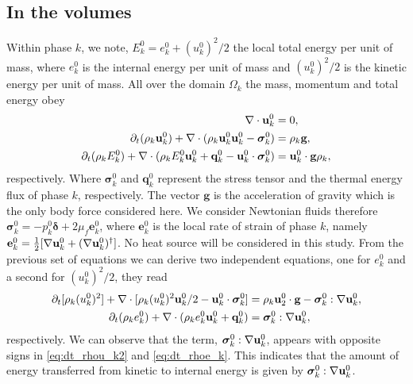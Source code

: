\subsection{In the volumes}
Within phase $k$, we note, $E_k^0 = e_k^0 + (u_k^0)^2/2$ the local total energy per unit of mass, where $e_k^0$ is the internal energy per unit of mass and $(u_k^0)^2/2$ is the kinetic energy per unit of mass.
All over the domain $\Omega_k$ the mass, momentum and total energy obey 
\begin{align}
    \label{eq:dt_rho}
    \div \textbf{u}_k^0
    &= 
    0,\\
    \label{eq:dt_rhou_k}
    \pddt (\rho_k\textbf{u}_k^0)  
    + \div (
        \rho_k\textbf{u}_k^0\textbf{u}_k^0
        - \bm{\sigma}_k^0 
    )
    &= 
    \rho_k \textbf{g},\\
    \label{eq:dt_rhoE_k}
    \pddt (\rho_kE_k^0)  
    + \div (
        \rho_kE_k^0\textbf{u}_k^0
        + \textbf{q}_k^0
        - \textbf{u}_k^0 \cdot \bm{\sigma}_k^0 
        )
    &= 
    \textbf{u}_k^0 \cdot \textbf{g}  \rho_k, 
\end{align} 
respectively. 
Where $\bm\sigma_k^0$ and $\textbf{q}_k^0$ represent the stress tensor and the thermal energy flux of phase $k$, respectively. 
The vector $\textbf{g}$ is the acceleration of gravity which is the only body force considered here.
We consider Newtonian fluids therefore $\bm\sigma_k^0 = -p_k^0\bm\delta + 2\mu_f \textbf{e}_k^0$, where $\textbf{e}_k^0$ is the local rate of strain of phase $k$, namely $\textbf{e}_k^0 = \frac{1}{2}[\mathbf{\nabla} \textbf{u}_k^0 + (\mathbf{\nabla} \textbf{u}_k^0)^\dagger]$. 
No heat source will be considered in this study. 
From the previous set of equations we can derive two independent equations, one for $e_k^0$ and a second for $(u_k^0)^2/2$, they read
\begin{align}
    \label{eq:dt_rhou_k2}
    \pddt [\rho_k(u_k^0)^2]  
    + \div [\rho_k(u_k^0)^2\textbf{u}_k^0/2 - \textbf{u}_k^0 \cdot \bm{\sigma}_k^0]
    &=
    \rho_k\textbf{u}_2^0 \cdot \textbf{g}  
    -  \bm{\sigma}_k^0 : \grad \textbf{u}_k^0,
    \\
    \label{eq:dt_rhoe_k}
    \pddt (\rho_ke_k^0)  
    + \div (
        \rho_ke_k^0\textbf{u}_k^0
        + \textbf{q}_k^0
        )
    &= 
    \bm{\sigma}_k^0 : \grad \textbf{u}_k^0,
\end{align} 
respectively. 
We can observe that the term, $\bm{\sigma}_k^0 : \mathbf{\nabla} \textbf{u}_k^0$,  appears with opposite signs in \ref{eq:dt_rhou_k2} and \ref{eq:dt_rhoe_k}.
This indicates that the amount of energy transferred from kinetic to internal energy is given by $\bm{\sigma}_k^0 : \mathbf{\nabla} \textbf{u}_k^0$.

